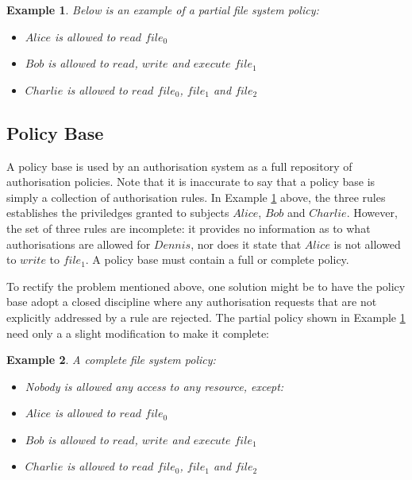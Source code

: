 \documentclass[11pt]{report}
\newtheorem{vexample}{Example}[chapter]
\begin{document}
        \begin{vexample}
          \label{exam-intro-poli1}
          Below is an example of a partial file system policy:
          \begin{itemize}
            \item
              $Alice$ is allowed to $read$ $file_0$
            \item
              $Bob$ is allowed to $read$, $write$ and $execute$ $file_1$
            \item
              $Charlie$ is allowed to $read$ $file_0$, $file_1$ and $file_2$
          \end{itemize}
        \end{vexample}

      \subsection{Policy Base}

        A policy base is used by an authorisation system as a full repository
        of authorisation policies. Note that it is inaccurate to say that a
        policy base is simply a collection of authorisation rules. In Example
        \ref{exam-intro-poli1} above, the three rules establishes the
        priviledges granted to subjects $Alice$, $Bob$ and $Charlie$. However,
        the set of three rules are incomplete: it provides no information as to
        what authorisations are allowed for $Dennis$, nor does it state that
        $Alice$ is not allowed to $write$ to $file_1$. A policy base must
        contain a full or complete policy.

        To rectify the problem mentioned above, one solution might be to
        have the policy base adopt a closed discipline where any authorisation
        requests that are not explicitly addressed by a rule are rejected.
        The partial policy shown in Example \ref{exam-intro-poli1} need only a
        a slight modification to make it complete:

        \begin{vexample}
          \label{exam-intro-poli2}
          A complete file system policy:
          \begin{itemize}
            \item
              Nobody is allowed any access to any resource, except:
            \item
              $Alice$ is allowed to $read$ $file_0$
            \item
              $Bob$ is allowed to $read$, $write$ and $execute$ $file_1$
            \item
              $Charlie$ is allowed to $read$ $file_0$, $file_1$ and $file_2$
          \end{itemize}
        \end{vexample}
\end{document}
